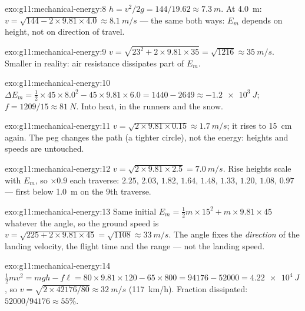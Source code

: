 \begin{solution}{exo:g11:mechanical-energy:8}
$h = v^2/2g = 144/19.62 \approx \qty{7.3}{m}$. At \qty{4.0}{m}:
$v = \sqrt{144 - 2 \times 9.81 \times 4.0} \approx \qty{8.1}{m/s}$ ---
the same both ways: $E_m$ depends on height, not on direction of travel.
\end{solution}

\begin{solution}{exo:g11:mechanical-energy:9}
$v = \sqrt{23^2 + 2 \times 9.81 \times 35} = \sqrt{1216} \approx
\qty{35}{m/s}$. Smaller in reality: air resistance dissipates part of
$E_m$.
\end{solution}

\begin{solution}{exo:g11:mechanical-energy:10}
$\Delta E_m = \tfrac12 \times 45 \times 8.0^2 - 45 \times 9.81 \times
6.0 = 1440 - 2649 \approx \qty{-1.2e3}{J}$;
$f = 1209/15 \approx \qty{81}{N}$. Into heat, in the runners and the
snow.
\end{solution}

\begin{solution}{exo:g11:mechanical-energy:11}
$v = \sqrt{2 \times 9.81 \times 0.15} \approx \qty{1.7}{m/s}$; it rises
to \qty{15}{cm} again. The peg changes the path (a tighter circle), not
the energy: heights and speeds are untouched.
\end{solution}

\begin{solution}{exo:g11:mechanical-energy:12}
$v = \sqrt{2 \times 9.81 \times 2.5} = \qty{7.0}{m/s}$. Rise heights
scale with $E_m$, so $\times 0.9$ each traverse: $2.25$, $2.03$, $1.82$,
$1.64$, $1.48$, $1.33$, $1.20$, $1.08$, $0.97$ --- first below
\qty{1.0}{m} on the $9$th traverse.
\end{solution}

\begin{solution}{exo:g11:mechanical-energy:13}
Same initial $E_m = \tfrac12 m \times 15^2 + m \times 9.81 \times 45$
whatever the angle, so the ground speed is
$v = \sqrt{225 + 2 \times 9.81 \times 45} = \sqrt{1108} \approx
\qty{33}{m/s}$. The angle fixes the \emph{direction} of the landing
velocity, the flight time and the range --- not the landing speed.
\end{solution}

\begin{solution}{exo:g11:mechanical-energy:14}
$\tfrac12 mv^2 = mgh - f\ell = 80 \times 9.81 \times 120 - 65 \times
800 = \num{94176} - \num{52000} = \qty{4.22e4}{J}$, so
$v = \sqrt{2 \times \num{42176}/80} \approx \qty{32}{m/s}$
(\qty{117}{km/h}). Fraction dissipated: $52000/94176 \approx 55\%$.
\end{solution}

